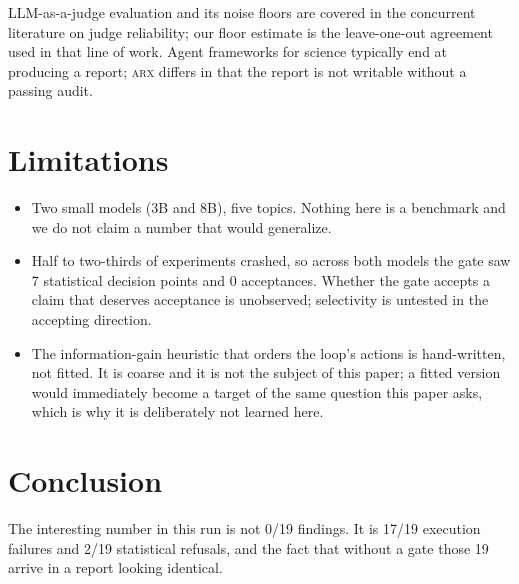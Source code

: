 \documentclass[11pt]{article}
\newcommand{\toolname}{\textsc{arx}}
\begin{document}
LLM-as-a-judge evaluation and its noise floors are covered in the concurrent
literature on judge reliability; our floor estimate is the leave-one-out
agreement used in that line of work. Agent frameworks for science typically
end at producing a report; \toolname{} differs in that the report is not
writable without a passing audit.

\section{Limitations}

\begin{itemize}
\item Two small models (3B and 8B), five topics. Nothing here is a benchmark
and we do not claim a number that would generalize.
\item Half to two-thirds of experiments crashed, so across both models the
gate saw 7 statistical decision points and 0 acceptances. Whether the gate
accepts a claim that deserves acceptance is unobserved; selectivity is
untested in the accepting direction.
\item The information-gain heuristic that orders the loop's actions is
hand-written, not fitted. It is coarse and it is not the subject of this
paper; a fitted version would immediately become a target of the same
question this paper asks, which is why it is deliberately not learned here.
\end{itemize}

\section{Conclusion}

The interesting number in this run is not 0/19 findings. It is 17/19 execution
failures and 2/19 statistical refusals, and the fact that without a gate those
19 arrive in a report looking identical.
\end{document}
